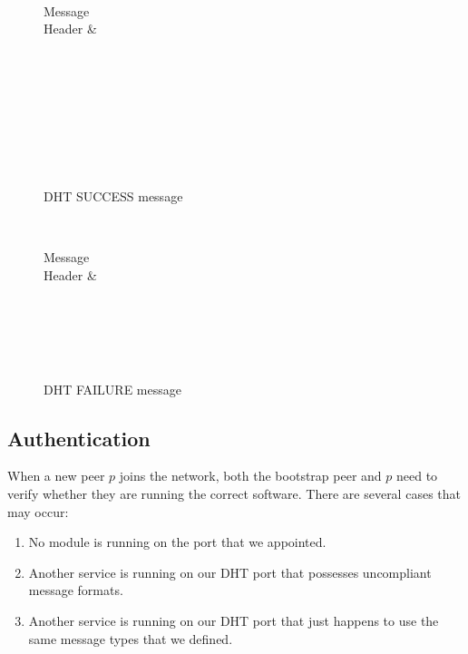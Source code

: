 \documentclass[a4paper, 11pt]{article}
\begin{document}
\begin{figure}[h!]
	\centering
	\begin{bytefield}[bitwidth=0.8em]{32}
		 \\
		\begin{rightwordgroup}{Message \\  Header}
			 & 
		\end{rightwordgroup} \\
		 \\
		\skippedwords \\
		 \\
		 \\
		\skippedwords \\
		 \\
	\end{bytefield}
	\caption{DHT SUCCESS message}
	\label{DHTSUCCESS}
\end{figure}

\begin{figure}[h!]
	\centering
	\begin{bytefield}[bitwidth=0.8em]{32}
		 \\
		\begin{rightwordgroup}{Message \\  Header}
			 & 
		\end{rightwordgroup} \\
		 \\
		\skippedwords \\
		 \\
	\end{bytefield}
	\caption{DHT FAILURE message}
	\label{DHTFAILURE}
\end{figure}

\subsection*{Authentication}

When a new peer $p$ joins the network, both the bootstrap peer and $p$ need to verify whether they are running the correct software. There are several cases that may occur:

\begin{enumerate}
	\item No module is running on the port that we appointed.
	\item Another service is running on our DHT port that possesses uncompliant message formats. 
	\item Another service is running on our DHT port that just happens to use the same message types that we defined.
\end{enumerate}
\end{document}
